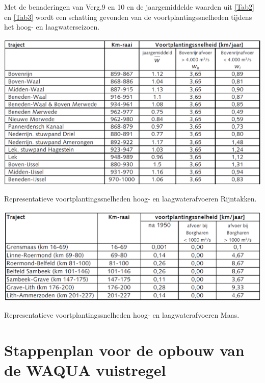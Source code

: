 Met de benaderingen van Verg.9 en 10 en de jaargemiddelde waarden uit \autoref{Tab2} en \autoref{Tab3} wordt een schatting gevonden van de voortplantingssnelheden tijdens het hoog- en laagwaterseizoen.

\begin{table}
\includegraphics[width=\columnwidth]{figures/Tab4_the2nd.png}
\caption{Representatieve voortplantingssnelheden hoog- en laagwaterafvoeren Rijntakken.}
\label{Tab4}
\end{table}

\begin{table}
\includegraphics[width=\columnwidth]{figures/Tab5.png}
\caption{Representatieve voortplantingssnelheden hoog- en laagwaterafvoeren Maas.}
\label{Tab5}
\end{table}

\section{Stappenplan voor de opbouw van de WAQUA vuistregel}

